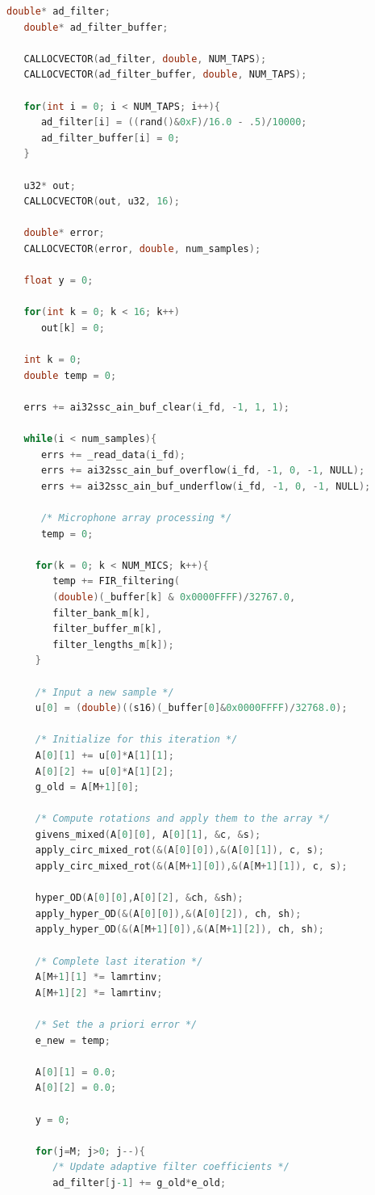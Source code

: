 \begin{lstlisting}[language=C]
   double* ad_filter;
   double* ad_filter_buffer;

   CALLOCVECTOR(ad_filter, double, NUM_TAPS);
   CALLOCVECTOR(ad_filter_buffer, double, NUM_TAPS);

   for(int i = 0; i < NUM_TAPS; i++){
      ad_filter[i] = ((rand()&0xF)/16.0 - .5)/10000;
      ad_filter_buffer[i] = 0;
   }

   u32* out;
   CALLOCVECTOR(out, u32, 16);

   double* error;
   CALLOCVECTOR(error, double, num_samples);

   float y = 0;

   for(int k = 0; k < 16; k++)
      out[k] = 0;

   int k = 0;
   double temp = 0;

   errs += ai32ssc_ain_buf_clear(i_fd, -1, 1, 1);

   while(i < num_samples){
      errs += _read_data(i_fd);
      errs += ai32ssc_ain_buf_overflow(i_fd, -1, 0, -1, NULL);
      errs += ai32ssc_ain_buf_underflow(i_fd, -1, 0, -1, NULL);

      /* Microphone array processing */
      temp = 0;

     for(k = 0; k < NUM_MICS; k++){
        temp += FIR_filtering(
        (double)(_buffer[k] & 0x0000FFFF)/32767.0,
        filter_bank_m[k],
        filter_buffer_m[k],
        filter_lengths_m[k]);
     }

     /* Input a new sample */
     u[0] = (double)((s16)(_buffer[0]&0x0000FFFF)/32768.0);

     /* Initialize for this iteration */
     A[0][1] += u[0]*A[1][1];
     A[0][2] += u[0]*A[1][2];
     g_old = A[M+1][0];

     /* Compute rotations and apply them to the array */
     givens_mixed(A[0][0], A[0][1], &c, &s);
     apply_circ_mixed_rot(&(A[0][0]),&(A[0][1]), c, s);
     apply_circ_mixed_rot(&(A[M+1][0]),&(A[M+1][1]), c, s);

     hyper_OD(A[0][0],A[0][2], &ch, &sh);
     apply_hyper_OD(&(A[0][0]),&(A[0][2]), ch, sh);
     apply_hyper_OD(&(A[M+1][0]),&(A[M+1][2]), ch, sh);

     /* Complete last iteration */
     A[M+1][1] *= lamrtinv;
     A[M+1][2] *= lamrtinv;

     /* Set the a priori error */
     e_new = temp;

     A[0][1] = 0.0;
     A[0][2] = 0.0;

     y = 0;

     for(j=M; j>0; j--){
        /* Update adaptive filter coefficients */
        ad_filter[j-1] += g_old*e_old;


\end{lstlisting}

